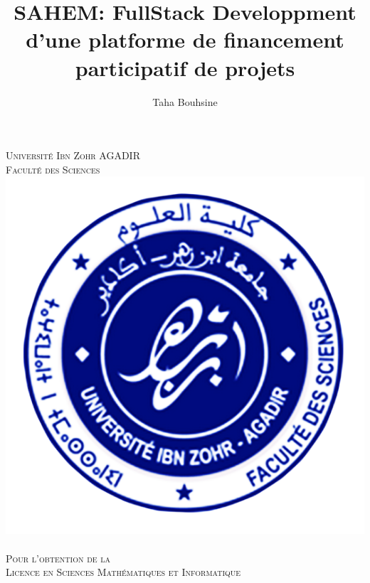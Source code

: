 \documentclass[11pt, openany]{report}
\begin{document}
\title{SAHEM: FullStack Developpment d'une platforme de financement participatif de projets  }
\author{Taha Bouhsine}
\date{}


\thispagestyle{empty}
\renewcommand{\chaptermark}[1]{\markboth{\chaptername\ \thechapter. #1}{}}
\renewcommand{\sectionmark}[1]{\markright{\thesection. #1}}


\makeatletter
\def\figurename{{\protect\sc \protect\small\bfseries Fig.}}
\let\captionORI\caption
\def\caption#1{\captionORI{\rm\small #1}}
\makeatother


\begin{titlepage}
  \begin{sffamily}
  \begin{center}

    \textsc{\LARGE Université Ibn Zohr AGADIR\\
        Faculté des Sciences\\[1cm]
        }
    \includegraphics[scale=0.35]{assets/fsa.png}~\\[1cm]

    \textsc{ Pour l’obtention de la \\
    \Large Licence en Sciences Mathématiques et Informatique }\\[1.5cm]


\end{center}
\end{sffamily}
\end{titlepage}
\end{document}
